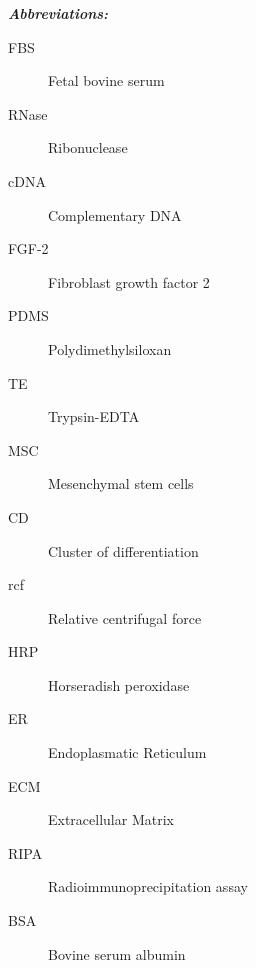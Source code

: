 \textit{\textbf{Abbreviations:}}
\begin{description}
\item[FBS] Fetal bovine serum
\item[RNase] Ribonuclease
\item[cDNA] Complementary DNA
\item[FGF-2] Fibroblast growth factor 2
\item[PDMS] Polydimethylsiloxan
\item[TE] Trypsin-EDTA
\item[MSC] Mesenchymal stem cells 
\item[CD] Cluster of differentiation
\item[rcf] Relative centrifugal force
\item[HRP] Horseradish peroxidase
\item[ER] Endoplasmatic Reticulum
\item[ECM] Extracellular Matrix
\item[RIPA] Radioimmunoprecipitation assay
\item[BSA] Bovine serum albumin
\end{description}